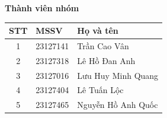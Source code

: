 \documentclass[12pt,a4paper]{article}
\begin{document}
\begin{titlepage}
  \vspace{0.5cm}

  {\Large\bfseries Thành viên nhóm}\par
  \vspace{0.2cm}

  \small
  \begin{tabular}{@{}cll@{}}
    \toprule
    \textbf{STT} & \textbf{MSSV} & \textbf{Họ và tên} \\
    \midrule
    1 & 23127141 & Trần Cao Vân \\
    2 & 23127318 & Lê Hồ Đan Anh \\
    3 & 23127016 & Lưu Huy Minh Quang \\
    4 & 23127404 & Lê Tuấn Lộc \\
    5 & 23127465 & Nguyễn Hồ Anh Quốc \\
    \bottomrule
  \end{tabular}\par
  \normalsize

\end{titlepage}

\newpage
{}
\tableofcontents
\newpage









\end{document}
